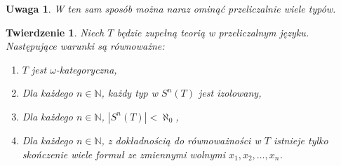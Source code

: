 \documentclass{article}
\newcommand{\N}{\mathbb{N}}
\theoremstyle{plain}
\newtheorem{tw}[thm]{Twierdzenie}
\newtheorem{uw}[thm]{Uwaga}
\theoremstyle{definition}
\theoremstyle{remark}
\begin{document}
\begin{uw}
	 W ten sam sposób można naraz ominąć przeliczalnie wiele typów.
\end{uw}

\begin{tw}
	 Niech $T$ będzie zupełną teorią w przeliczalnym języku.
	 Następujące warunki są równoważne:
	 \begin{enumerate}
		 \item $T$ jest $\omega$-kategoryczna,
		 \item Dla każdego $n \in \N$, każdy typ w $S^n(T)$ jest
			 izolowany,
		 \item Dla każdego $n \in \N$, $|S^n(T)| < \aleph_0$,
		 \item Dla każdego $n \in \N$, z dokładnością do równoważności
			 w $T$ istnieje tylko skończenie wiele formuł ze
			 zmiennymi wolnymi $x_1, x_2, \ldots, x_n$.
	 \end{enumerate}
\end{tw}
\end{document}
